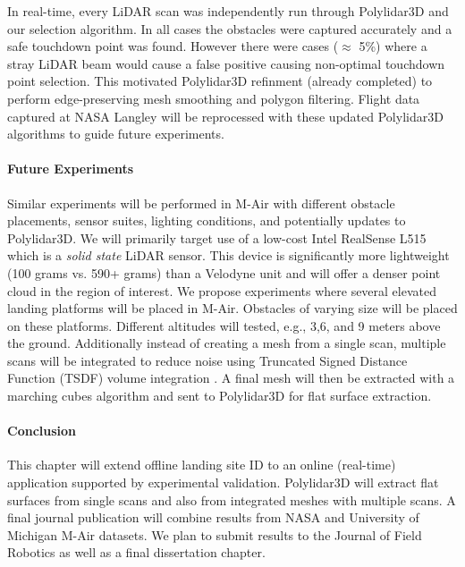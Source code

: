 In real-time, every LiDAR scan was independently run through Polylidar3D and our selection algorithm.  In all cases the obstacles were captured accurately and a safe touchdown point was found. However there were cases ($\approx$ 5\%) where a stray LiDAR beam would cause a false positive causing non-optimal touchdown point selection. This motivated Polylidar3D refinment (already completed) to perform edge-preserving mesh smoothing and polygon filtering. Flight data captured at NASA Langley will be reprocessed with these updated Polylidar3D algorithms to guide future experiments.


\paragraph{Future Experiments}

Similar experiments will be performed in M-Air with different obstacle placements, sensor suites, lighting conditions, and potentially updates to Polylidar3D. We will primarily target use of a low-cost Intel RealSense L515 which is a \emph{solid state} LiDAR sensor. This device is significantly more lightweight (100 grams vs. 590+ grams) than a Velodyne unit and will offer a denser point cloud in the region of interest. We propose experiments where several elevated landing platforms will be placed in M-Air. Obstacles of varying size will be placed on these platforms. Different altitudes will tested, e.g., 3,6, and 9 meters above the ground.  Additionally instead of creating a mesh from a single scan,  multiple scans will be integrated to reduce noise using Truncated Signed Distance Function (TSDF) volume integration \cite{10.1145/237170.237269}. A final mesh will then be extracted with a marching cubes algorithm \cite{10.1145/37401.37422} and sent to Polylidar3D for flat surface extraction. 

\paragraph{Conclusion}

This chapter will extend offline landing site ID to an online (real-time) application supported by experimental validation.  Polylidar3D will extract flat surfaces from single scans and also from integrated meshes with multiple scans. A final journal publication will combine results from NASA and University of Michigan M-Air datasets.  We plan to submit results to the Journal of Field Robotics as well as a final dissertation chapter.






